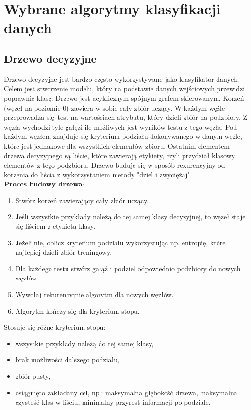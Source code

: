 \section{Wybrane algorytmy klasyfikacji danych}
\subsection{Drzewo decyzyjne}
Drzewo decyzyjne jest bardzo często wykorzystywane jako klasyfikator danych. Celem jest stworzenie modelu, który na podstawie danych wejściowych przewidzi poprawnie klasę. Drzewo jest acyklicznym spójnym grafem skierowanym. Korzeń (węzeł na poziomie 0) zawiera w sobie cały zbiór uczący. W każdym węźle przeprowadza się test na wartościach atrybutu, który dzieli zbiór na podzbiory. Z węzła wychodzi tyle gałęzi ile możliwych jest wyników testu z tego węzła. Pod każdym węzłem znajduje się kryterium podziału dokonywanego w danym węźle, które jest jednakowe dla wszystkich elementów zbioru. Ostatnim elementem drzewa decyzyjnego są liście, które zawierają etykiety, czyli przydział klasowy elementów z tego podzbioru. Drzewo buduje się w sposób rekurencyjny od korzenia do liścia z wykorzystaniem metody "dziel i zwyciężaj".\\
\textbf{Proces budowy drzewa}:
\begin{enumerate}
	\item Stwórz korzeń zawierający cały zbiór uczący.
	\item Jeśli wszystkie przykłady należą do tej samej klasy decyzyjnej, to węzeł staje się liściem z etykietą klasy.
	\item Jeżeli nie, oblicz kryterium podziału wykorzystując np. entropię, które najlepiej dzieli zbiór treningowy.
	\item Dla każdego testu stwórz gałąź i podziel odpowiednio podzbiory do nowych węzłów.
	\item Wywołaj rekurencyjnie algorytm dla nowych węzłów.
	\item Algorytm kończy się dla kryterium stopu.
\end{enumerate}
Stosuje się różne kryterium stopu:
\begin{itemize}
	\item wszystkie przykłady należą do tej samej klasy,
	\item brak możliwości dalszego podziału,
	\item zbiór pusty,
	\item osiągnięto zakładany cel, np.: maksymalna głębokość drzewa, maksymalna czystość klas w liściu, minimalny przyrost informacji po podziale.
\end{itemize}
